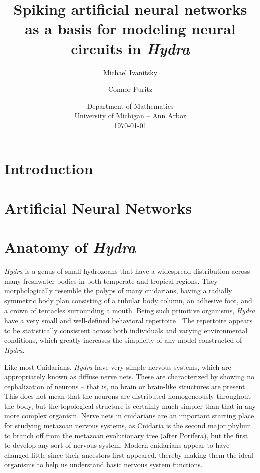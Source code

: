\documentclass{article}
\begin{document}
\title{Spiking artificial neural networks as a basis for modeling neural circuits in \textit{Hydra}}

\author{Michael Ivanitsky \and Connor Puritz}
\date{%
    Department of Mathematics\\ University of Michigan -- Ann Arbor\\[2ex]%
    \today
}

\maketitle

\begin{abstract}
\end{abstract}

\section{Introduction}
\newpage

\section{Artificial Neural Networks}
\newpage

\section{Anatomy of \textit{Hydra}}
\textit{Hydra} is a genus of small hydrozoans that have a widespread distribution across many freshwater bodies in both temperate and tropical regions. They morphologically resemble the polyps of many cnidarians, having a radially symmetric body plan consisting of a tubular body column, an adhesive foot, and a crown of tentacles surrounding a mouth. Being such primitive organisms, \textit{Hydra} have a very small and well-defined behavioral repertoire \cite{behavior}. The repertoire appears to be statistically consistent across both individuals and varying environmental conditions, which greatly increases the simplicity of any model constructed of \textit{Hydra}.

Like most Cnidarians, \textit{Hydra} have very simple nervous systems, which are appropriately known as diffuse nerve nets. These are characterized by showing no cephalization of neurons -- that is, no brain or brain-like structures are present. This does not mean that the neurons are distributed homogeneously throughout the body, but the topological structure is certainly much simpler than that in any more complex organism. Nerve nets in cnidarians are an important starting place for studying metazoan nervous systems, as Cnidaria is the second major phylum to branch off from the metazoan evolutionary tree (after Porifera), but the first to develop any sort of nervous system. Modern cnidarians appear to have changed little since their ancestors first appeared, thereby making them the ideal organisms to help us understand basic nervous system functions.
\end{document}
